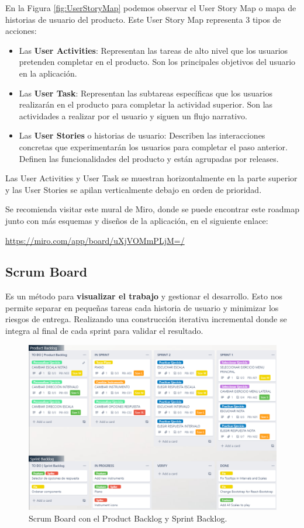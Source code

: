 \documentclass[12pt,twoside,titlepage]{report}
\begin{document}
En la Figura \ref{fig:UserStoryMap} podemos observar el User Story Map o mapa de historias de usuario del producto. Este User Story Map representa 3 tipos de acciones:
\begin{itemize}
    \item Las \textbf{User Activities}: Representan las tareas de alto nivel que los usuarios pretenden completar en el producto. Son los principales objetivos del usuario en la aplicación. 
    \item Las \textbf{User Task}: Representan las subtareas específicas que los usuarios realizarán en el producto para completar la actividad superior. Son las actividades a realizar por el usuario y siguen un flujo narrativo. 
    \item Las \textbf{User Stories} o historias de usuario: Describen las interacciones concretas que experimentarán los usuarios para completar el paso anterior. Definen las funcionalidades del producto y están agrupadas por releases.  
\end{itemize}

Las User Activities y User Task se muestran horizontalmente en la parte superior y las User Stories se apilan verticalmente debajo en orden de prioridad.

Se recomienda visitar este mural de Miro, donde se puede encontrar este roadmap junto con más esquemas y diseños de la aplicación, en el siguiente enlace: 

\href{https://miro.com/app/board/uXjVOMmPLjM=/?share_link_id=588058562303}{https://miro.com/app/board/uXjVOMmPLjM=/}

\subsection{Scrum Board}

Es un método para \textbf{visualizar el trabajo} y gestionar el desarrollo. Esto nos permite separar en pequeñas tareas cada historia de usuario y minimizar los riesgos de entrega. Realizando una construcción iterativa incremental donde se integra al final de cada sprint para validar el resultado. 
\cite{scrumboard1}
\cite{scrumboard2}

\begin{figure}[H]
    \centering
    \includegraphics[scale=0.47]{Scrum/ScrumBoard}
    \caption{Scrum Board con el Product Backlog y Sprint Backlog.}
    \label{fig:ScrumBoard}
\end{figure}
\end{document}

